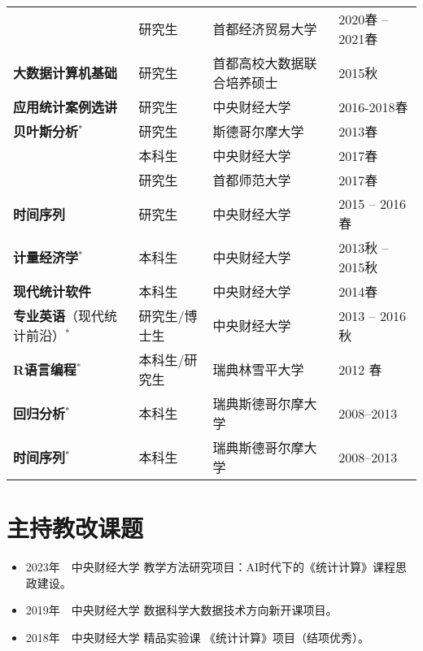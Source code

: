 \documentclass[twoside,a4paper,11pt]{article}
\begin{document}
\begin{center}
{\begin{tabular}{llll}
                                                & 研究生                & 首都经济贸易大学               & 2020春 --2021春  \\
      \textbf{大数据计算机基础}                 & 研究生                & 首都高校大数据联合培养硕士     & 2015秋           \\
      \textbf{应用统计案例选讲}                 & 研究生                & 中央财经大学                   & 2016-2018春      \\
      \textbf{贝叶斯分析}$^*$                   & 研究生                & 斯德哥尔摩大学                 & 2013春           \\
                                                & 本科生                & 中央财经大学                   & 2017春           \\
                                                & 研究生                & 首都师范大学                   & 2017春           \\
      \textbf{时间序列}                         & 研究生                & 中央财经大学                   & 2015 -- 2016春   \\
      \textbf{计量经济学}$^*$                   & 本科生                & 中央财经大学                   & 2013秋 -- 2015秋 \\
      \textbf{现代统计软件}                     & 本科生                & 中央财经大学                   & 2014春           \\
      \textbf{专业英语}（现代统计前沿）$^*$     & 研究生/博士生         & 中央财经大学                   & 2013 -- 2016秋   \\
      \textbf{R语言编程}$^*$                    & 本科生/研究生         & 瑞典林雪平大学                 & 2012 春          \\
      \textbf{回归分析}$^*$                     & 本科生                & 瑞典斯德哥尔摩大学             & 2008--2013       \\
      \textbf{时间序列}$^*$                     & 本科生                & 瑞典斯德哥尔摩大学             & 2008--2013       \\
      \bottomrule
    \end{tabular}
  }
\end{center}

\section{主持教改课题}

\begin{itemize}
\item 2023年~~中央财经大学 教学方法研究项目：AI时代下的《统计计算》课程思政建设。
\item 2019年~~中央财经大学 数据科学大数据技术方向新开课项目。
\item 2018年~~中央财经大学 精品实验课 《统计计算》项目（结项优秀）。
\end{itemize}
\end{document}
